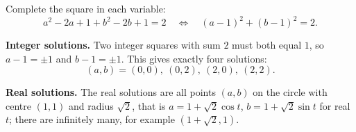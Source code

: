 Complete the square in each variable:
\[
a^2-2a+1+b^2-2b+1=2\quad\Longleftrightarrow\quad (a-1)^2+(b-1)^2=2 .
\]

\textbf{Integer solutions.} Two integer squares with sum $2$ must both equal $1$, so $a-1=\pm1$ and $b-1=\pm1$. This gives exactly four solutions:
\[
\boxed{(a,b)=(0,0),\ (0,2),\ (2,0),\ (2,2)} .
\]

\textbf{Real solutions.} The real solutions are all points $(a,b)$ on the circle with centre $(1,1)$ and radius $\sqrt2$, that is $a=1+\sqrt2\cos t$, $b=1+\sqrt2\sin t$ for real $t$; there are infinitely many, for example $\left(1+\sqrt2,1\right)$.
